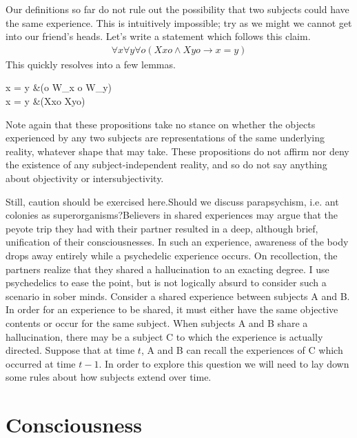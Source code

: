 \documentclass[leqno]{article}
\newcounter{lemma}
\newcommand{\note}{}
\begin{document}
	Our definitions so far do not rule out the possibility that two subjects could
	have the same experience. This is intuitively impossible; try as we might we
	cannot get into our friend's heads. Let's write a statement which follows this
	claim. %
	\begin{align}
		\label{prop:subject-identity}                                    %
		\forall x \forall y \forall o ( Xxo \land Xyo \rightarrow x = y)
	\end{align}%
	\noindent
	This quickly resolves into a few lemmas.%
	\begin{lemmalist}
		\label{prop:world-exclusion} %
		x \not= y &\rightarrow (o \in W_x \rightarrow o \not\in W_y) \\ \label{prop:experience-exclusion} %
		x \not= y &\rightarrow \neg(Xxo \land Xyo)
	\end{lemmalist}%
	Note again that these propositions take no stance on whether the objects experienced
	by any two subjects are representations of the same underlying reality,
	whatever shape that may take. These propositions do not affirm nor deny the existence
	of any subject-independent reality, and so do not say anything about
	objectivity or intersubjectivity.

	Still, caution should be exercised here.\note{Should we discuss parapsychism, i.e. ant colonies as superorganisms?}Believers
	in shared experiences may argue that the peyote trip they had with their partner
	resulted in a deep, although brief, unification of their consciousnesses. In
	such an experience, awareness of the body drops away entirely while a psychedelic
	experience occurs. On recollection, the partners realize that they shared a hallucination
	to an exacting degree. I use psychedelics to ease the point, but is not logically
	absurd to consider such a scenario in sober minds. Consider a shared
	experience between subjects A and B. In order for an experience to be shared,
	it must either have the same objective contents or occur for the same subject.
	When subjects A and B share a hallucination, there may be a subject C to which
	the experience is actually directed. Suppose that at time $t$, A and B can
	recall the experiences of C which occurred at time $t- 1$. In order to explore
	this question we will need to lay down some rules about how subjects extend over
	time.

	\section{Consciousness}
\end{document}
